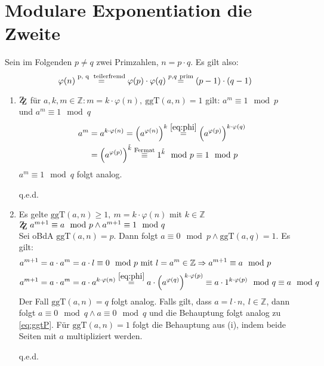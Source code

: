 \documentclass[DIN, pagenumber=false, fontsize=11pt, parskip=half]{scrartcl}
\newcommand{\Z}[0]{\mathbb{Z}}
\newcommand{\ZZ}{\mathrm{Z\kern-.3em\raise-0.5ex\hbox{Z}}}
\newcommand{\ggt}{\text{ggT}}
\newcommand{\congTo}[3][]{\stackrel{#1}{\equiv} #2\mod #3}
\newcommand{\Qed}{\begin{flushright}
    q.e.d.
\end{flushright}}
\begin{document}
    \section{Modulare Exponentiation die Zweite}
    Sein  im Folgenden $p \neq q$ zwei Primzahlen, $n = p \cdot q$. Es gilt also:
    \begin{equation}
        \varphi(n) \stackrel{\text{p, q \ \text{teilerfremd}}}{=} \varphi(p) \cdot \varphi(q) \stackrel{p, q \ \text{prim}}{=} (p - 1) \cdot (q - 1)
        \label{eq:phi}
    \end{equation}
    \begin{enumerate}[label=(\roman*)]
        \item $\ZZ$ für $a, k, m \in \Z :  m = k \cdot \varphi(n), \ \ggt(a, n) = 1$ gilt: $a^m \congTo{1}{p}$ \\ und $a^m \congTo{1}{q}$ \\
              \begin{align}
                  a^m &= a^{k \cdot \varphi(n)} = \left(a^{\varphi(n)}\right)^k \stackrel{\ref{eq:phi}}{=} \left(a^{\varphi(p)}\right)^{k \cdot \varphi(q)} \\
                  &= \left(a^{\varphi(p)}\right)^{\tilde{k}} \congTo[\text{Fermat}]{1^{\tilde{k}}}{p} \congTo{1}{p}
              \end{align}
              $a^m \congTo{1}{q}$ folgt analog. \Qed
        \item Es gelte $\ggt(a, n) \geq 1, \ m = k \cdot \varphi(n)$ mit $k \in \Z$ \\
              $\ZZ \ a^{m + 1} \congTo{a}{p} \wedge a^{m + 1} \congTo{1}{q}$ \\
              Sei oBdA $\ggt(a, n) = p$. Dann folgt $a \congTo{0}{p} \wedge \ggt(a, q) = 1$. Es gilt:
              \begin{align}
                  \label{eq:ggtP}
                  a^{m + 1} &= a \cdot a^m = a \cdot l \congTo{0}{p} \ \text{mit} \ l = a^m \in \Z \Rightarrow a^{m + 1} \congTo{a}{p} \\
                  a^{m + 1} &= a \cdot a^m = a \cdot a^{k \cdot \varphi(n)} \stackrel{\ref{eq:phi}}{=} a \cdot \left(a^{\varphi(q)}\right)^{k \cdot \varphi(p)}
                  \congTo{a \cdot 1^{k \cdot \varphi(p)}}{q} \congTo{a}{q}
              \end{align}
              Der Fall $\ggt(a, n) = q$ folgt analog. Falls gilt, dass $a = l \cdot n, \ l \in \Z$, dann folgt $a \congTo{0}{q} \wedge a \congTo{0}{q}$ und
              die Behauptung folgt analog zu \cref{eq:ggtP}. Für $\ggt(a, n) = 1$ folgt die Behauptung aus (i), indem beide Seiten mit $a$ multipliziert werden. \Qed

\end{enumerate}
\end{document}
